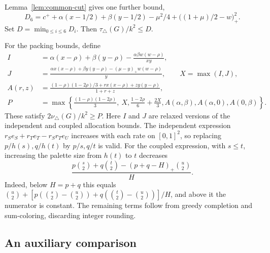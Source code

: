 \documentclass[11pt]{article}
\newcommand{\tp}{\nu_{\triangle}}
\newcommand{\tc}{\tau_{\triangle}}
\begin{document}
Lemma~\ref{lem:common-cut} gives one further bound,
\[
 D_6=c^++\alpha(x-1/2)+\beta(y-1/2)-\mu^2/4
              +\bigl((1+\mu)/2-w\bigr)_+^2.
\]
Set $D=\min_{0\leq i\leq6}D_i$. Then $\tc(G)/k^2\leq D$.

For the packing bounds, define
\begin{align*}
 I&=\alpha(x-\rho)+\beta(y-\rho)
          -\frac{\alpha\beta w(w-\rho)}{xy},\\
 J&=\frac{\alpha x(x-\rho)+\beta y(y-\rho)
          -(\mu-y)_+w(w-\rho)}{y},\qquad X=\max(I,J),\\
 A(r,z)&=\frac{(1-\rho)(1-2\rho)/3
          +r x(x-\rho)+z y(y-\rho)}{1+r+z},\\
 P&=\max\left\{\frac{(1-\rho)(1-2\rho)}3,\ X,
       \frac{1-2\rho}{6}+\frac{2X}{3},
       A(\alpha,\beta),A(\alpha,0),A(0,\beta)\right\}.
\end{align*}
These satisfy $2\tp(G)/k^2\geq P$. Here $I$ and $J$ are relaxed
versions of the independent and coupled allocation bounds. The
independent expression $r_Se_S+r_Te_T-r_Sr_Te_U$ increases with each
rate on $[0,1]^2$, so replacing $p/h(s),q/h(t)$ by $p/s,q/t$ is valid.
For the coupled expression, with $s\leq t$, increasing the palette
size from $h(t)$ to $t$ decreases
\[
 \frac{p\binom{s}{2}+q\binom{t}{2}-(p+q-H)_+\binom{u}{2}}{H}.
\]
Indeed, below $H=p+q$ this equals
$\binom{u}{2}+[p(\binom{s}{2}-\binom{u}{2})+
q(\binom{t}{2}-\binom{u}{2})]/H$, and above it the numerator is
constant. The remaining terms follow from greedy completion and
sum-coloring, discarding integer rounding.

\subsection{An auxiliary comparison}
\end{document}
